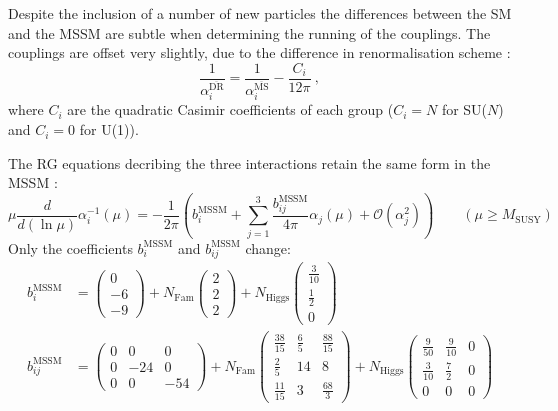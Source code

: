 \documentclass[12pt,a4paper,oneside]{article}
\begin{document}
Despite the inclusion of a number of new particles the differences between the SM and the MSSM are subtle when determining the running of the couplings. The couplings are offset very slightly, due to the difference in renormalisation scheme \cite{amaldi}:
\[
\frac{1}{\alpha_i^{\overline{\mathrm{DR}}}} = \frac{1}{\alpha_i^{\overline{\mathrm{MS}}}} - \frac{C_i}{12 \pi} \:,
\]
where $C_i$ are the quadratic Casimir coefficients of each group ($C_i = N$ for SU($N$) and $C_i = 0$ for U(1)). 

The RG equations decribing the three interactions retain the same form in the MSSM \cite{b, mssm-renorm}:
\begin{equation}
\mu \dfrac{d}{d (\ln \mu)} \alpha_i^{-1} (\mu) = -\dfrac{1}{2 \pi} \left( b^\mathrm{MSSM}_i + \sum_{j=1}^{3} \dfrac{b^\mathrm{MSSM}_{i j}}{4 \pi} \alpha_j (\mu) + \mathcal{O}(\alpha_j^2) \right) \quad\quad (\mu \geq M_\mathrm{SUSY})
\label{eqn:mssm-beta}
\end{equation}
Only the coefficients $b^\mathrm{MSSM}_i$ and $b^\mathrm{MSSM}_{i j}$ change:
\singlespace
\begin{align}
b^\mathrm{MSSM}_i &= 
\begin{pmatrix} 0 \\ -6 \\ -9 \end{pmatrix} 
+ N_\mathrm{Fam} \begin{pmatrix} 2 \\ 2 \\ 2 \end{pmatrix} 
+ N_\mathrm{Higgs} \begin{pmatrix} \frac{3}{10} \\ \frac{1}{2} \\ 0 \end{pmatrix} \nonumber\\
b^\mathrm{MSSM}_{ij} &= 
\begin{pmatrix} 
0 & 0 & 0 \\ 
0 & -24 & 0 \\ 
0 & 0 & -54
\end{pmatrix}
+ N_\mathrm{Fam} 
\begin{pmatrix} 
\frac{38}{15} & \frac{6}{5} & \frac{88}{15} \\ 
\frac{2}{5} & 14 & 8 \\ 
\frac{11}{15} & 3 & \frac{68}{3}
\end{pmatrix}
+ N_\mathrm{Higgs}
\begin{pmatrix}
\frac{9}{50} & \frac{9}{10} & 0 \\
\frac{3}{10} & \frac{7}{2} & 0 \\
0 & 0 & 0
\nonumber
\end{pmatrix} 
\end{align}
\end{document}
